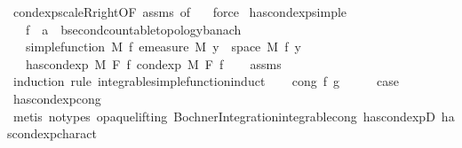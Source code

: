 \begin{isabellebody}
\ cond{\isacharunderscore}{\kern0pt}exp{\isacharunderscore}{\kern0pt}scaleR{\isacharunderscore}{\kern0pt}right{\isacharbrackleft}{\kern0pt}OF\ assms{\isacharcomma}{\kern0pt}\ of\ {\isachardoublequoteopen}{\isacharminus}{\kern0pt}{}{\isachardoublequoteclose}{\isacharbrackright}{\kern0pt}\ \isamarkupfalse%
\ force%
\endisatagproof
{\isafoldproof}%
%
\isadelimproof
\isanewline
%
\endisadelimproof
\isanewline
{}\isamarkupfalse%
\ has{\isacharunderscore}{\kern0pt}cond{\isacharunderscore}{\kern0pt}exp{\isacharunderscore}{\kern0pt}simple{\isacharcolon}{\kern0pt}\isanewline
\ \ \ f\ {\isacharcolon}{\kern0pt}{\isacharcolon}{\kern0pt}\ {\isachardoublequoteopen}{\isacharprime}{\kern0pt}a\ {\isasymRightarrow}\ {\isacharprime}{\kern0pt}b{\isacharcolon}{\kern0pt}{\isacharcolon}{\kern0pt}{\isacharbraceleft}{\kern0pt}second{\isacharunderscore}{\kern0pt}countable{\isacharunderscore}{\kern0pt}topology{\isacharcomma}{\kern0pt}banach{\isacharbraceright}{\kern0pt}{\isachardoublequoteclose}\isanewline
\ \ \ {\isachardoublequoteopen}simple{\isacharunderscore}{\kern0pt}function\ M\ f{\isachardoublequoteclose}\ {\isachardoublequoteopen}emeasure\ M\ {\isacharbraceleft}{\kern0pt}y\ {\isasymin}\ space\ M{\isachardot}{\kern0pt}\ f\ y\ {\isasymnoteq}\ {}{\isacharbraceright}{\kern0pt}\ {\isasymnoteq}\ {\isasyminfinity}{\isachardoublequoteclose}\isanewline
\ \ \ {\isachardoublequoteopen}has{\isacharunderscore}{\kern0pt}cond{\isacharunderscore}{\kern0pt}exp\ M\ F\ f\ {\isacharparenleft}{\kern0pt}cond{\isacharunderscore}{\kern0pt}exp\ M\ F\ f{\isacharparenright}{\kern0pt}{\isachardoublequoteclose}\isanewline
%
\isadelimproof
\ \ %
\endisadelimproof
%
\isatagproof
{}\isamarkupfalse%
\ assms\isanewline
{}\isamarkupfalse%
\ {\isacharparenleft}{\kern0pt}induction\ rule{\isacharcolon}{\kern0pt}\ integrable{\isacharunderscore}{\kern0pt}simple{\isacharunderscore}{\kern0pt}function{\isacharunderscore}{\kern0pt}induct{\isacharparenright}{\kern0pt}\isanewline
\ \ \isamarkupfalse%
\ {\isacharparenleft}{\kern0pt}cong\ f\ g{\isacharparenright}{\kern0pt}\isanewline
\ \ \isamarkupfalse%
\ \isamarkupfalse%
\ {\isacharquery}{\kern0pt}case\ \isamarkupfalse%
\ has{\isacharunderscore}{\kern0pt}cond{\isacharunderscore}{\kern0pt}exp{\isacharunderscore}{\kern0pt}cong\ \isamarkupfalse%
\ {\isacharparenleft}{\kern0pt}metis\ {\isacharparenleft}{\kern0pt}no{\isacharunderscore}{\kern0pt}types{\isacharcomma}{\kern0pt}\ opaque{\isacharunderscore}{\kern0pt}lifting{\isacharparenright}{\kern0pt}\ Bochner{\isacharunderscore}{\kern0pt}Integration{\isachardot}{\kern0pt}integrable{\isacharunderscore}{\kern0pt}cong\ has{\isacharunderscore}{\kern0pt}cond{\isacharunderscore}{\kern0pt}expD{\isacharparenleft}{\kern0pt}{}{\isacharparenright}{\kern0pt}\ has{\isacharunderscore}{\kern0pt}cond{\isacharunderscore}{\kern0pt}exp{\isacharunderscore}{\kern0pt}charact{\isacharparenleft}{\kern0pt}{}{\isacharparenright}{\kern0pt}{\isacharparenright}{\kern0pt}\isanewline

\end{isabellebody}
